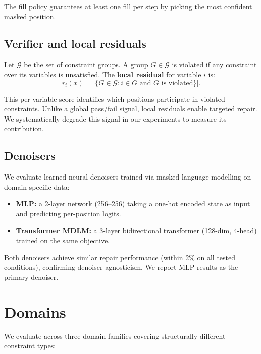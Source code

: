 \documentclass[11pt,a4paper,twoside]{article}
\theoremstyle{definition}
\newcommand{\cG}{\mathcal G}
\begin{document}
The fill policy guarantees at least one fill per step by picking the most confident masked position.

\subsection{Verifier and local residuals}
\label{sec:verifier}

Let $\cG$ be the set of constraint groups. A group $G \in \cG$ is violated if any constraint over its variables is unsatisfied. The \textbf{local residual} for variable $i$ is:
\begin{equation}
r_i(x) = |\{G \in \cG : i \in G \text{ and } G \text{ is violated}\}|.
\end{equation}

This per-variable score identifies which positions participate in violated constraints. Unlike a global pass/fail signal, local residuals enable targeted repair. We systematically degrade this signal in our experiments to measure its contribution.

\subsection{Denoisers}
\label{sec:denoisers}

We evaluate learned neural denoisers trained via masked language modelling on domain-specific data:
\begin{itemize}[leftmargin=2em]
    \item \textbf{MLP:} a 2-layer network (256--256) taking a one-hot encoded state as input and predicting per-position logits.
    \item \textbf{Transformer MDLM:} a 3-layer bidirectional transformer (128-dim, 4-head) trained on the same objective.
\end{itemize}
Both denoisers achieve similar repair performance (within 2\% on all tested conditions), confirming denoiser-agnosticism. We report MLP results as the primary denoiser.

\section{Domains}
\label{sec:domains}

We evaluate across three domain families covering structurally different constraint types:
\end{document}
